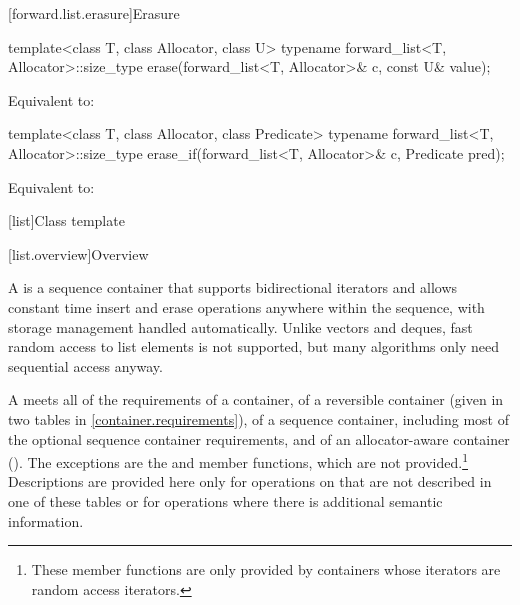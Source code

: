 [forward.list.erasure]{Erasure}

%
\begin{itemdecl}
template<class T, class Allocator, class U>
  typename forward_list<T, Allocator>::size_type
    erase(forward_list<T, Allocator>& c, const U& value);
\end{itemdecl}

\begin{itemdescr}
\pnum
\effects
Equivalent to: 
\end{itemdescr}

%
\begin{itemdecl}
template<class T, class Allocator, class Predicate>
  typename forward_list<T, Allocator>::size_type
    erase_if(forward_list<T, Allocator>& c, Predicate pred);
\end{itemdecl}

\begin{itemdescr}
\pnum
\effects
Equivalent to: 
\end{itemdescr}

[list]{Class template }

[list.overview]{Overview}

\pnum
{}%
A
is a sequence container that supports
bidirectional iterators and allows constant time insert and erase
operations anywhere within the sequence, with storage management handled
automatically. Unlike vectors and deques,
fast random access to list elements is not supported, but many
algorithms only need sequential access anyway.

\pnum
A  meets all of the requirements of a container, of
a reversible container (given in two tables in
\ref{container.requirements}), of a sequence container,
including most of the optional sequence container
requirements, and of an allocator-aware container
().
The exceptions are the
and
member functions, which are not provided.\footnote{These member functions
are only provided by containers whose iterators
are random access iterators.
}
Descriptions are provided here only for operations on
that are not described in one of these tables
or for operations where there is additional semantic information.

